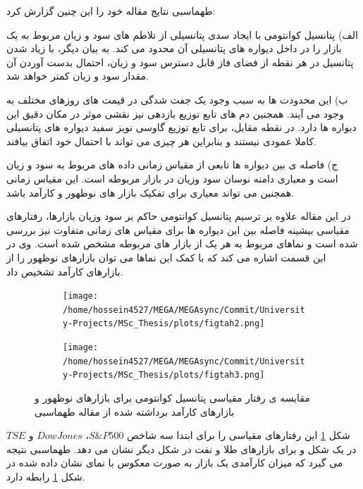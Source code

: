 \documentclass[a4paper,titlepage,12pt,fleqn,oneside]{report}
\begin{document}
	طهماسبی نتایج مقاله خود را این چنین گزارش کرد:
	
	الف) پتانسیل کوانتومی با ایجاد سدی پتانسیلی از تلاطم های سود و زیان مربوط به یک بازار را در داخل دیواره های پتانسیلی آن محدود می کند. به بیان دیگر، با زیاد شدن پتانسیل در هر نقطه از فضای فاز قابل دسترس سود و زیان، احتمال بدست آوردن آن مقدار سود و زیان کمتر خواهد شد. 
	
	
	ب) این محدودت ها به سبب وجود یک جفت شدگی در قیمت های روزهای مختلف به وجود می آیند. همجنین دم های تابع توزیع بازدهی نیز نقشی موثر در مکان دقیق این دیواره ها دارد. در نقطه مقابل، برای تابع توزیع گاوسی نویز سفید دیواره های پتانسیلی کاملا عمودی نیستند  و بنابراین هر  چیزی می تواند با احتمال خود اتفاق بیافند. 
	
	
	ج) فاصله ی بین دیواره ها تابعی از مقیاس زمانی داده های مربوط به سود و زیان است و معباری دامنه نوسان سود وزیان در بازار مربوطه است. این مقیاس زمانی همجنین می تواند معیاری برای تفکیک بازار های نوظهور و کارآمد باشد. 
	
	
	در این مقاله علاوه بر ترسیم پتانسیل کوانتومی حاکم بر سود وزیان بازارها، رفتارهای مقیاسی بیشینه فاصله بین این دیواره ها برای مقیاس های زمانی متفاوت نیز بررسی شده است و نماهای مربوط به هر یک از بازار های مربوطه مشخص شده است. وی در این قسمت اشاره می کند که با کمک این نماها می توان بازارهای نوظهور را از بازارهای کارآمد تشخیص داد.
	\begin{figure}[ptb]
		\begin{subfigure}[b]{0.5\textwidth}
			\renewcommand\thesubfigure{i}
			\centering
			\texttt{[image: /home/hossein4527/MEGA/MEGAsync/Commit/University-Projects/MSc\_Thesis/plots/figtah2.png]}
		\end{subfigure}
		\hfill
		\begin{subfigure}[b]{0.5\textwidth}
			\renewcommand\thesubfigure{i}
			\centering
			\texttt{[image: /home/hossein4527/MEGA/MEGAsync/Commit/University-Projects/MSc\_Thesis/plots/figtah3.png]}
		\end{subfigure}
		\hfill
		\caption{مقایسه ی رفتار مقیاسی پتانسیل کوانتومی  برای بازارهای نوظهور و بازارهای کارآمد برداشته شده از مقاله طهماسبی
			\cite{tahmaseb}}
		\label{fig:9}
	\end{figure}
	شکل
	\ref{fig:9}
	این رفتارهای مقیاسی را برای ابتدا سه شاخص 
	$S\&P500$،
	$Dow Jones$
	و  
	$TSE$
	در یک شکل و برای بازارهای طلا و نفت در شکل دیگر نشان می دهد. طهماسبی نتیجه می گیرد که میزان کارآمدی یک بازار به صورت معکوس با نمای نشان داده شده در شکل
	\ref{fig:9}
	رابطه دارد. 
	
	
	\newpage
\end{document}
